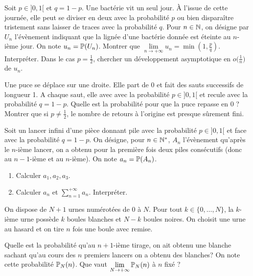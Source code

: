 \begin{exercise}
	Soit $p\in]0,1[$ et $q=1-p$. Une bactérie vit un seul jour. \`A l'issue de
	cette journée, elle peut se diviser en deux avec la probabilité $p$ ou bien
	disparaître tristement sans laisser de traces avec la probabilité $q$. Pour
	$n\in\N$, on désigne par $U_{n}$ l'évènement indiquant que la lignée d'une
	bactérie donnée est éteinte au $n$-ième jour. On note $u_{n}=\P(U_{n})$.
	Montrer que $\lim\limits_{n\to+\infty}u_{n}=\min(1,\frac{p}{q})$. Interpréter.
	Dans le cas $p=\frac{1}{2}$, chercher un développement asymptotique en
	$o\bigl(\frac{1}{n}\bigr)$ de $u_{n}$.
\end{exercise}

\begin{exercise}
	Une puce se déplace sur une droite. Elle part de 0 et fait des sauts
	successifs de longueur 1. A chaque saut, elle avec avec la probabilité
	$p\in]0,1[$ et recule avec la probabilité $q=1-p$. Quelle est la probabilité
	pour que la puce repasse en 0 ? Montrer que si $p\neq\frac{1}{2}$, le nombre
	de retours à l'origine est presque sûrement fini.
\end{exercise}

\begin{exercise}
	Soit un lancer infini d'une pièce donnant pile avec la probabilité $p\in]0,1[$
	et face avec la probabilité $q=1-p$. On désigne, pour $n\in\N^{*}$, $A_{n}$
	l'évènement qu'après le $n$-ième lancer, on a obtenu pour la première fois
	deux piles consécutifs (donc au $n-1$-ième et au $n$-ième). On note
	$a_{n}=\P(A_{n})$.
	
	\begin{enumerate}
		\item
		Calculer $a_{1},a_{2},a_{3}$.
		\item
		Calculer $a_{n}$ et $\sum_{n=1}^{+\infty}a_{n}$. Interpréter.
	\end{enumerate}
\end{exercise}

\begin{exercise}
	On dispose de $N+1$ urnes numérotées de $0$ à $N$. Pour tout
	$k\in\{0,\dots,N\}$, la $k$-ième urne possède $k$ boules blanches et $N-k$
	boules noires. On choisit une urne au hasard et on tire $n$ fois une boule
	avec remise.

	Quelle est la probabilité qu'au $n+1$-ième tirage, on ait obtenu une
	blanche sachant qu'au cours des $n$ premiers lancers on a obtenu des
	blanches? On note cette probabilité $\P_{N}(n)$.
	Que vaut $\lim\limits_{N\to+\infty}\P_{N}(n)$ à $n$ fixé ?
\end{exercise}


